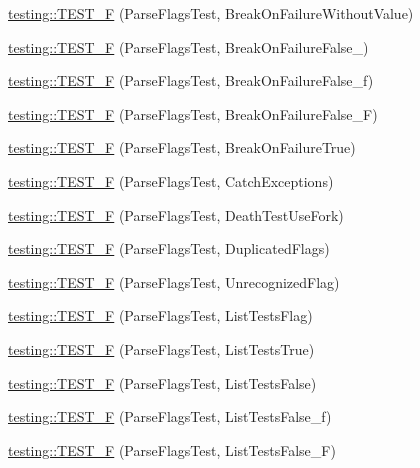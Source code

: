 \begin{DoxyCompactItemize}
\item 
\mbox{\hyperlink{namespacetesting_ab540cabc9d829c20052609a685a01832}{testing\+::\+T\+E\+S\+T\+\_\+F}} (Parse\+Flags\+Test, Break\+On\+Failure\+Without\+Value)
\item 
\mbox{\hyperlink{namespacetesting_ac5a39f27868bd123d9c5bca03730845e}{testing\+::\+T\+E\+S\+T\+\_\+F}} (Parse\+Flags\+Test, Break\+On\+Failure\+False\+\_)
\item 
\mbox{\hyperlink{namespacetesting_afe2c0e1666f3dad816ae5dbdfc37357a}{testing\+::\+T\+E\+S\+T\+\_\+F}} (Parse\+Flags\+Test, Break\+On\+Failure\+False\+\_\+f)
\item 
\mbox{\hyperlink{namespacetesting_a92c1ef6a2453eaec5c33bb92dfd3667f}{testing\+::\+T\+E\+S\+T\+\_\+F}} (Parse\+Flags\+Test, Break\+On\+Failure\+False\+\_\+F)
\item 
\mbox{\hyperlink{namespacetesting_a2a23ab14983f9e6296149ac711301968}{testing\+::\+T\+E\+S\+T\+\_\+F}} (Parse\+Flags\+Test, Break\+On\+Failure\+True)
\item 
\mbox{\hyperlink{namespacetesting_a9e50d6fa46cc314e8d7fa4a829ee6c0d}{testing\+::\+T\+E\+S\+T\+\_\+F}} (Parse\+Flags\+Test, Catch\+Exceptions)
\item 
\mbox{\hyperlink{namespacetesting_a767f2b2467c0242492922c205a666e64}{testing\+::\+T\+E\+S\+T\+\_\+F}} (Parse\+Flags\+Test, Death\+Test\+Use\+Fork)
\item 
\mbox{\hyperlink{namespacetesting_a76c39020708d7e6646c8aeef149ea827}{testing\+::\+T\+E\+S\+T\+\_\+F}} (Parse\+Flags\+Test, Duplicated\+Flags)
\item 
\mbox{\hyperlink{namespacetesting_a876c9749edf7e23132e0b47ad8cfe02c}{testing\+::\+T\+E\+S\+T\+\_\+F}} (Parse\+Flags\+Test, Unrecognized\+Flag)
\item 
\mbox{\hyperlink{namespacetesting_a3fb86cb10e61ed9007bd22c5ba3b2c62}{testing\+::\+T\+E\+S\+T\+\_\+F}} (Parse\+Flags\+Test, List\+Tests\+Flag)
\item 
\mbox{\hyperlink{namespacetesting_a5ce87a07245c10d86d465cb8db493065}{testing\+::\+T\+E\+S\+T\+\_\+F}} (Parse\+Flags\+Test, List\+Tests\+True)
\item 
\mbox{\hyperlink{namespacetesting_a983e3df92745027bf68413ecc09f4198}{testing\+::\+T\+E\+S\+T\+\_\+F}} (Parse\+Flags\+Test, List\+Tests\+False)
\item 
\mbox{\hyperlink{namespacetesting_a381c90024f28d66ed25e687a94c8b329}{testing\+::\+T\+E\+S\+T\+\_\+F}} (Parse\+Flags\+Test, List\+Tests\+False\+\_\+f)
\item 
\mbox{\hyperlink{namespacetesting_a05a7a818dedb4fdf5b0aac632d97e2dc}{testing\+::\+T\+E\+S\+T\+\_\+F}} (Parse\+Flags\+Test, List\+Tests\+False\+\_\+F)

\end{DoxyCompactItemize}
